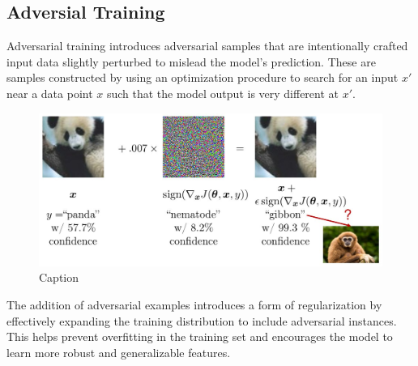 \newpage
\subsection{Adversial Training}

Adversarial training introduces adversarial samples that are intentionally crafted input data slightly perturbed to mislead the model’s prediction. These are samples constructed by using an optimization procedure to search for an input $x'$ near a data point $x$ such that the model output is very different at $x'$.

\begin{figure}[h]
    \centering
    \includegraphics[width=12cm]{Images/adversarial-training.jpg}
    \caption{Caption}
    \label{fig:enter-label}
\end{figure}

\noindent The addition of adversarial examples introduces a form of regularization by effectively expanding the training distribution to include adversarial instances. This helps prevent overfitting in the training set and encourages the model to learn more robust and generalizable features.


